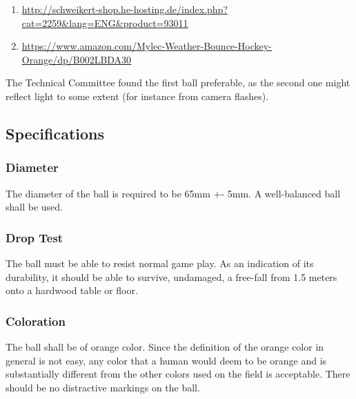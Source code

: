 \documentclass{article}
\begin{document}
\begin{enumerate}

\item \underline{\href{http://schweikert-shop.he-hosting.de/index.php?cat=2259&lang=ENG&product=93011}{http://schweikert-shop.he-hosting.de/index.php?cat=2259\&lang=ENG\&product=93011}}


\item \underline{\href{https://www.amazon.com/Mylec-Weather-Bounce-Hockey-Orange/dp/B002LBDA30}{https://www.amazon.com/Mylec-Weather-Bounce-Hockey-Orange/dp/B002LBDA30}}

\end{enumerate}

The Technical Committee found the first ball preferable, as the second one
might reflect light to some extent (for instance from camera flashes).

\subsection{Specifications}

\subsubsection{Diameter}

The diameter of the ball is required to be 65mm +- 5mm. A well-balanced ball
shall be used.

\subsubsection{Drop Test}

The ball must be able to resist normal game play. As an indication of its
durability, it should be able to survive, undamaged, a free-fall from 1.5
meters onto a hardwood table or floor.

\subsubsection{Coloration}

The ball shall be of orange color. Since the definition of the orange color in
general is not easy, any color that a human would deem to be orange and is
substantially different from the other colors used on the field is acceptable.
There should be no distractive markings on the ball.
\end{document}
